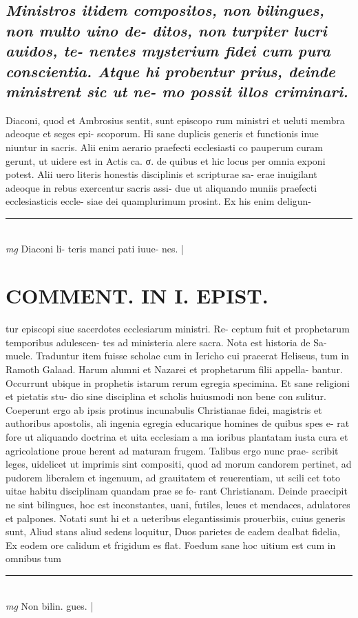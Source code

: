 \documentclass{article}
\begin{document}
\begin{pages}
\subsection*{\textit{Ministros itidem compositos, non bilingues, non multo uino de- ditos, non turpiter lucri auidos, te- nentes mysterium fidei cum pura conscientia. Atque hi probentur prius, deinde ministrent sic ut ne- mo possit illos criminari. }}\pstart Diaconi, quod et Ambrosius sentit, sunt episcopo rum ministri et ueluti membra adeoque et seges epi- scoporum. Hi sane duplicis generis et functionis inue niuntur in sacris. Alii enim aerario praefecti ecclesiasti co pauperum curam gerunt, ut uidere est in Actis ca. σ. de quibus et hic locus per omnia exponi potest. Alii uero literis honestis disciplinis et scripturae sa- erae inuigilant adeoque in rebus exercentur sacris assi- due ut aliquando muniis praefecti ecclesiasticis eccle- siae dei quamplurimum prosint. Ex his enim deligun-  \pend
\vspace{0.5cm}\noindent
\vspace{0.2cm}\rule{1cm}{0.2pt}\\ 
\hspace{0.2cm}\textit{mg}
\footnotesize Diaconi li- teris manci pati iuue- nes. 
\normalsize| 
\section*{COMMENT. IN I. EPIST. }\pstart tur episcopi siue sacerdotes ecclesiarum ministri. Re- ceptum fuit et prophetarum temporibus adulescen- tes ad ministeria alere sacra. Nota est historia de Sa- muele. Traduntur item fuisse scholae cum in Iericho cui praeerat Heliseus, tum in Ramoth Galaad. Harum alumni et Nazarei et prophetarum filii appella- bantur. Occurrunt ubique in prophetis istarum rerum egregia specimina. Et sane religioni et pietatis stu- dio sine disciplina et scholis huiusmodi non bene con sulitur. Coeperunt ergo ab ipsis protinus incunabulis Christianae fidei, magistris et authoribus apostolis, ali ingenia egregia educarique homines de quibus spes e- rat fore ut aliquando doctrina et uita ecclesiam a ma ioribus plantatam iusta cura et agricolatione proue herent ad maturam frugem. Talibus ergo nunc prae- scribit leges, uidelicet ut imprimis sint compositi, quod ad morum candorem pertinet, ad pudorem liberalem et ingenuum, ad grauitatem et reuerentiam, ut scili cet toto uitae habitu disciplinam quandam prae se fe- rant Christianam. Deinde praecipit ne sint bilingues, hoc est inconstantes, uani, futiles, leues et mendaces, adulatores et palpones. Notati sunt hi et a ueteribus elegantissimis prouerbiis, cuius generis sunt, Aliud stans aliud sedens loquitur, Duos parietes de eadem dealbat fidelia, Ex eodem ore calidum et frigidum es flat. Foedum sane hoc uitium est cum in omnibus tum  \pend
\vspace{0.5cm}\noindent
\vspace{0.2cm}\rule{1cm}{0.2pt}\\ 
\hspace{0.2cm}\textit{mg}
\footnotesize Non bilin. gues. 
\normalsize| 

\end{pages}
\end{document}
